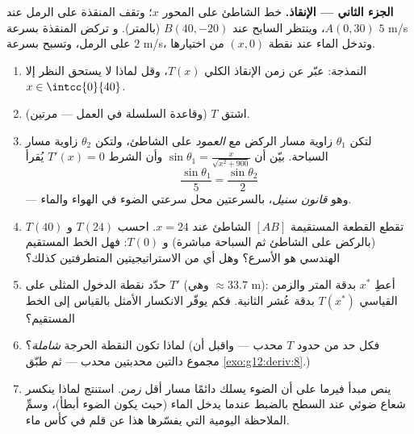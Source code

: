 \begin{problem}
\medskip
\noindent\textbf{الجزء الثاني --- الإنقاذ.}
خط الشاطئ على المحور $x$؛ وتقف المنقذة على الرمل عند
$A(0, 30)$، وينتظر السابح عند $B(40, -20)$ (بالمتر). و
تركض المنقذة بسرعة $5$ m/s على الرمل، وتسبح بسرعة $2$ m/s، وتدخل
الماء عند نقطة $(x, 0)$ من اختيارها.
\begin{enumerate}[resume]
  \item النمذجة: عبّر عن زمن الإنقاذ الكلي $T(x)$، وقل لماذا
        لا يستحق النظر إلا $x \in \intcc{0}{40}$.
  \item اشتق $T$ (وقاعدة السلسلة في العمل --- مرتين).
  \item لتكن $\theta_1$ زاوية مسار الركض مع
        \emph{العمود} على الشاطئ، ولتكن $\theta_2$ زاوية
        مسار السباحة. بيّن أن
        $\sin\theta_1 = \frac{x}{\sqrt{x^2 + 900}}$ وأن
        الشرط $T'(x) = 0$ يُقرأ
        \[
        \frac{\sin\theta_1}{5} = \frac{\sin\theta_2}{2}
        \]
        --- وهو \emph{قانون سنيل}، بالسرعتين محل
        سرعتي الضوء في الهواء والماء.
  \item تقطع القطعة المستقيمة $[AB]$ الشاطئ عند
        $x = 24$. احسب $T(24)$ و $T(40)$ (بالركض على
        الشاطئ ثم السباحة مباشرة) و $T(0)$: فهل الخط المستقيم
        الهندسي هو الأسرع؟ وهل أي من الاستراتيجيتين المتطرفتين
        كذلك؟
  \item حدّد نقطة الدخول المثلى  على
        $T'$ (وهي $\approx 33.7$ m): أعطِ $x^*$ بدقة المتر
        والزمن القياسي $T(x^*)$ بدقة عُشر الثانية.
        فكم يوفّر الانكسار الأمثل بالقياس إلى الخط
        المستقيم؟
  \item لماذا تكون النقطة الحرجة  \emph{شاملة}؟
        (فكل حد من حدود $T$ محدب --- واقبل أن مجموع
        دالتين محدبتين محدب --- ثم طبّق
        \cref{exo:g12:deriv:8}.)
  \item ينص مبدأ فيرما على أن الضوء يسلك دائمًا
        مسار أقل \emph{زمن}. استنتج لماذا ينكسر شعاع ضوئي
        عند السطح بالضبط عندما يدخل الماء
        (حيث يكون الضوء أبطأ)، وسمِّ الملاحظة اليومية
        التي يفسّرها هذا عن قلم في كأس ماء.
\end{enumerate}


\end{problem}
